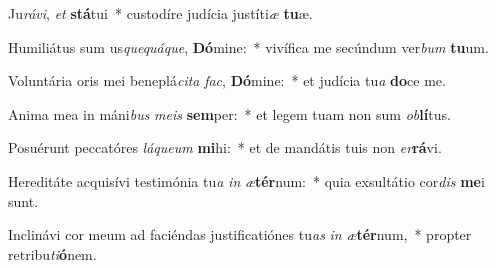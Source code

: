\item Ju\textit{rá}\textit{vi}, \textit{et} \textbf{stá}tui~* custodíre judícia justíti\textit{æ} \textbf{tu}æ.
\item Humiliátus sum us\textit{que}\textit{quá}\textit{que}, \textbf{Dó}mine:~* vivífica me secúndum ver\textit{bum} \textbf{tu}um.
\item Voluntária oris mei beneplá\textit{ci}\textit{ta} \textit{fac}, \textbf{Dó}mine:~* et judícia tu\textit{a} \textbf{do}ce me.
\item Anima mea in máni\textit{bus} \textit{me}\textit{is} \textbf{sem}per:~* et legem tuam non sum \textit{ob}\textbf{lí}tus.
\item Posuérunt peccatóres \textit{lá}\textit{que}\textit{um} \textbf{mi}hi:~* et de mandátis tuis non \textit{er}\textbf{rá}vi.
\item Hereditáte acquisívi testimónia tu\textit{a} \textit{in} \textit{æ}\textbf{tér}num:~* quia exsultátio cor\textit{dis} \textbf{me}i sunt.
\item Inclinávi cor meum ad faciéndas justificatiónes tu\textit{as} \textit{in} \textit{æ}\textbf{tér}num,~* propter retribu\textit{ti}\textbf{ó}nem.
